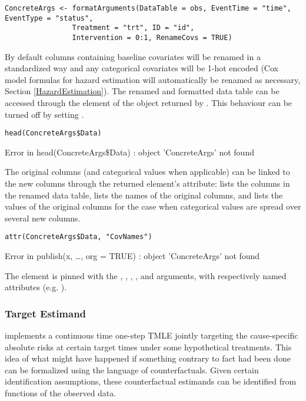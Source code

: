 \documentclass{report}
\newcommand{\1}{\ensuremath{\mathbf{1}}}
\begin{document}
\begin{lstlisting}
ConcreteArgs <- formatArguments(DataTable = obs, EventTime = "time", EventType = "status", 
				Treatment = "trt", ID = "id",
				Intervention = 0:1, RenameCovs = TRUE)
\end{lstlisting}

By default columns containing baseline covariates will be renamed in a standardized way and any categorical covariates will be 1-hot encoded (Cox model formulas for hazard estimation will automatically be renamed as necessary, Section \ref{HazardEstimation}). The renamed and formatted data table can be accessed through the  element of the  object returned by . This behaviour can be turned off by setting .

\begin{lstlisting}
head(ConcreteArgs$Data)
\end{lstlisting}

Error in head(ConcreteArgs\$Data) : object 'ConcreteArgs' not found

The original columns (and categorical values when applicable) can be linked to the new columns through the returned  element's  attribute:  lists the columns in the renamed data table,  lists the names of the original columns, and  lists the values of the original columns for the case when categorical values are spread over several new columns.   

\begin{lstlisting}
attr(ConcreteArgs$Data, "CovNames")
\end{lstlisting}

Error in publish(x, \ldots{}, org = TRUE) : object 'ConcreteArgs' not found

The  element is pinned with the , , , , and  arguments, with respectively named attributes (e.g. ).

\subsubsection{Target Estimand}
\label{Estimand}
 implements a continuous time one-step TMLE jointly targeting the cause-specific absolute risks at certain target times under some hypothetical treatments. This idea of what might have happened if something contrary to fact had been done can be formalized using the language of counterfactuals. Given certain identification assumptions, these counterfactual estimands can be identified from functions of the observed data.
\end{document}
